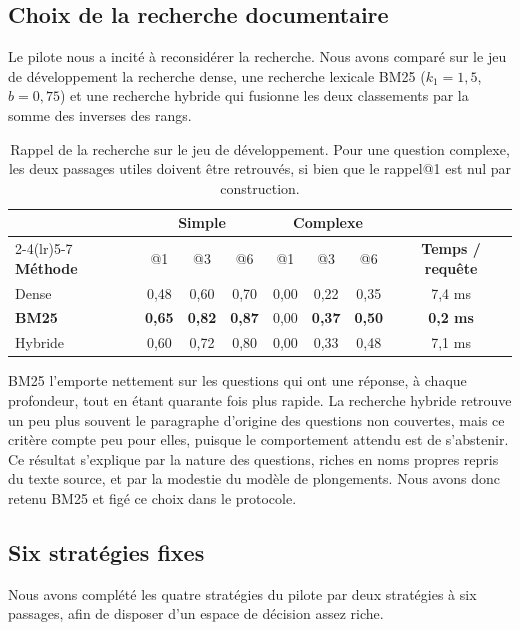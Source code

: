 \documentclass[11pt,a4paper]{article}
\begin{document}
\subsection{Choix de la recherche documentaire}

Le pilote nous a incité à reconsidérer la recherche. Nous avons comparé sur le jeu de développement la
recherche dense, une recherche lexicale BM25 ($k_1 = 1{,}5$, $b = 0{,}75$) et une recherche hybride qui
fusionne les deux classements par la somme des inverses des rangs.

\begin{table}[H]
\centering\small
\begin{tabular}{l c c c c c c c}
\toprule
& \multicolumn{3}{c}{\textbf{Simple}} & \multicolumn{3}{c}{\textbf{Complexe}} & \\
\cmidrule(lr){2-4}\cmidrule(lr){5-7}
\textbf{Méthode} & @1 & @3 & @6 & @1 & @3 & @6 & \textbf{Temps / requête} \\
\midrule
Dense   & 0,48 & 0,60 & 0,70 & 0,00 & 0,22 & 0,35 & 7,4 ms \\
\textbf{BM25} & \textbf{0,65} & \textbf{0,82} & \textbf{0,87} & 0,00 & \textbf{0,37} & \textbf{0,50} & \textbf{0,2 ms} \\
Hybride & 0,60 & 0,72 & 0,80 & 0,00 & 0,33 & 0,48 & 7,1 ms \\
\bottomrule
\end{tabular}
\caption{Rappel de la recherche sur le jeu de développement. Pour une question complexe, les deux
passages utiles doivent être retrouvés, si bien que le rappel@1 est nul par construction.}
\label{tab:recherche}
\end{table}

BM25 l'emporte nettement sur les questions qui ont une réponse, à chaque profondeur, tout en étant
quarante fois plus rapide. La recherche hybride retrouve un peu plus souvent le paragraphe d'origine des
questions non couvertes, mais ce critère compte peu pour elles, puisque le comportement attendu est de
s'abstenir. Ce résultat s'explique par la nature des questions, riches en noms propres repris du texte
source, et par la modestie du modèle de plongements. Nous avons donc retenu BM25 et figé ce choix dans
le protocole.

\subsection{Six stratégies fixes}

Nous avons complété les quatre stratégies du pilote par deux stratégies à six passages, afin de disposer
d'un espace de décision assez riche.
\end{document}
